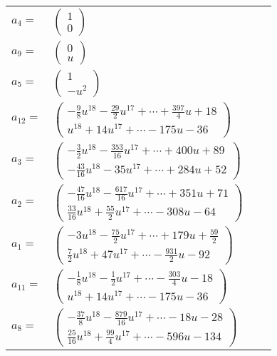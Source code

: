 \documentclass[1p]{elsarticle_modified}
\theoremstyle{definition}
\begin{document}
\begin{tabular}{m{7pt} m{180pt} m{7pt} m{180pt} }
\flushright $a_{4}=$&$\begin{pmatrix}1\\0\end{pmatrix}$ \\
\flushright $a_{9}=$&$\begin{pmatrix}0\\u\end{pmatrix}$ \\
\flushright $a_{5}=$&$\begin{pmatrix}1\\- u^2\end{pmatrix}$ \\
\flushright $a_{12}=$&$\begin{pmatrix}-\frac{9}{8} u^{18}-\frac{29}{2} u^{17}+\cdots+\frac{397}{4} u+18\\u^{18}+14 u^{17}+\cdots-175 u-36\end{pmatrix}$ \\
\flushright $a_{3}=$&$\begin{pmatrix}-\frac{3}{2} u^{18}-\frac{353}{16} u^{17}+\cdots+400 u+89\\-\frac{43}{16} u^{18}-35 u^{17}+\cdots+284 u+52\end{pmatrix}$ \\
\flushright $a_{2}=$&$\begin{pmatrix}-\frac{47}{16} u^{18}-\frac{617}{16} u^{17}+\cdots+351 u+71\\\frac{33}{16} u^{18}+\frac{55}{2} u^{17}+\cdots-308 u-64\end{pmatrix}$ \\
\flushright $a_{1}=$&$\begin{pmatrix}-3 u^{18}-\frac{75}{2} u^{17}+\cdots+179 u+\frac{59}{2}\\\frac{7}{2} u^{18}+47 u^{17}+\cdots-\frac{931}{2} u-92\end{pmatrix}$ \\
\flushright $a_{11}=$&$\begin{pmatrix}-\frac{1}{8} u^{18}-\frac{1}{2} u^{17}+\cdots-\frac{303}{4} u-18\\u^{18}+14 u^{17}+\cdots-175 u-36\end{pmatrix}$ \\
\flushright $a_{8}=$&$\begin{pmatrix}-\frac{37}{8} u^{18}-\frac{879}{16} u^{17}+\cdots-18 u-28\\\frac{25}{16} u^{18}+\frac{99}{4} u^{17}+\cdots-596 u-134\end{pmatrix}$ \\

\end{tabular}
\end{document}

